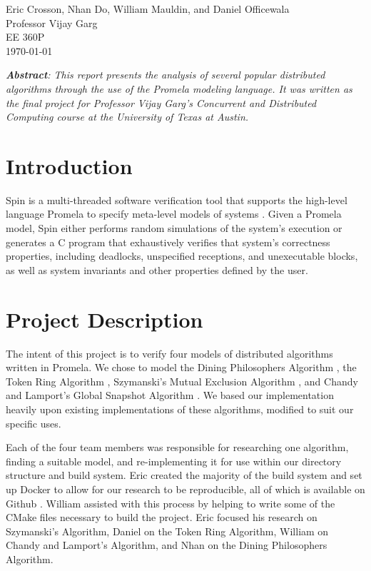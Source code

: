 \documentclass[12pt]{article}
\begin{document}
\begin{flushleft}
Eric Crosson, Nhan Do, William Mauldin, and Daniel Officewala \\
Professor Vijay Garg\\
EE 360P \\
\today \\

\begin{center}
  \emph{\textbf{Abstract}: This report presents the analysis of several popular
    distributed algorithms through the use of the Promela modeling language.  It
    was written as the final project for Professor Vijay Garg's Concurrent and
    Distributed Computing course at the University of Texas at Austin.}
\end{center}

\setlength{\parindent}{0.5in}
\section{Introduction}
Spin is a multi-threaded software verification tool that supports the high-level
language Promela to specify meta-level models of systems \cite{spinroot}. Given
a Promela model, Spin either performs random simulations of the system's
execution or generates a C program that exhaustively verifies that system's
correctness properties, including deadlocks, unspecified receptions, and
unexecutable blocks, as well as system invariants and other properties defined
by the user.

\section{Project Description}
The intent of this project is to verify four models of distributed algorithms
written in Promela. We chose to model the Dining Philosophers Algorithm
\cite{din:phil}, the Token Ring Algorithm \cite{toking}, Szymanski's Mutual
Exclusion Algorithm \cite{szymanski:info}, and Chandy and Lamport's Global
Snapshot Algorithm \cite{ch:01}. We based our implementation heavily upon
existing implementations of these algorithms, modified to suit our specific
uses.

Each of the four team members was responsible for researching one algorithm,
finding a suitable model, and re-implementing it for use within our directory
structure and build system. Eric created the majority of the build system and
set up Docker \cite{docker} to allow for our research to be reproducible, all of
which is available on Github \cite{github:camelot}. William assisted with this
process by helping to write some of the CMake files necessary to build the
project. Eric focused his research on Szymanski's Algorithm, Daniel on the Token
Ring Algorithm, William on Chandy and Lamport's Algorithm, and Nhan on the
Dining Philosophers Algorithm.


\end{flushleft}
\end{document}
